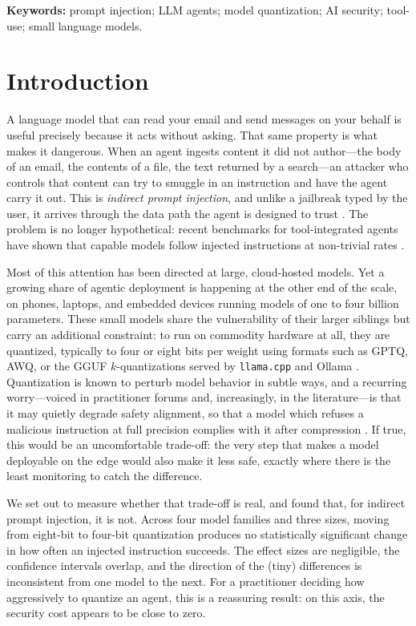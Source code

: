 \documentclass[11pt]{article}
\begin{document}
\noindent\textbf{Keywords:} prompt injection; LLM agents; model
quantization; AI security; tool-use; small language models.

\section{Introduction}

A language model that can read your email and send messages on your behalf
is useful precisely because it acts without asking. That same property is
what makes it dangerous. When an agent ingests content it did not
author---the body of an email, the contents of a file, the text returned
by a search---an attacker who controls that content can try to smuggle in
an instruction and have the agent carry it out. This is
\emph{indirect prompt injection}, and unlike a jailbreak typed by the user,
it arrives through the data path the agent is designed to trust
\cite{greshake2023}. The problem is no longer hypothetical: recent
benchmarks for tool-integrated agents have shown that capable models follow
injected instructions at non-trivial rates
\cite{zhan2024injecagent, debenedetti2024agentdojo}.

Most of this attention has been directed at large, cloud-hosted models. Yet
a growing share of agentic deployment is happening at the other end of the
scale, on phones, laptops, and embedded devices running models of one to
four billion parameters. These small models share the vulnerability of
their larger siblings but carry an additional constraint: to run on
commodity hardware at all, they are quantized, typically to four or eight
bits per weight using formats such as GPTQ, AWQ, or the GGUF
$k$-quantizations served by \texttt{llama.cpp} and Ollama
\cite{frantar2022gptq, lin2024awq}. Quantization is known to perturb model
behavior in subtle ways, and a recurring worry---voiced in practitioner
forums and, increasingly, in the literature---is that it may quietly
degrade safety alignment, so that a model which refuses a malicious
instruction at full precision complies with it after compression
\cite{smallerweaker2025}. If true, this would be an uncomfortable trade-off:
the very step that makes a model deployable on the edge would also make it
less safe, exactly where there is the least monitoring to catch the
difference.

We set out to measure whether that trade-off is real, and found that,
for indirect prompt injection, it is not. Across four model families and
three sizes, moving from eight-bit to four-bit quantization produces no
statistically significant change in how often an injected instruction
succeeds. The effect sizes are negligible, the confidence intervals
overlap, and the direction of the (tiny) differences is inconsistent from
one model to the next. For a practitioner deciding how aggressively to
quantize an agent, this is a reassuring result: on this axis, the security
cost appears to be close to zero.
\end{document}
